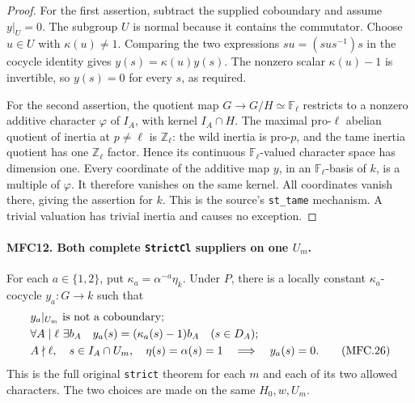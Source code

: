 \documentclass[11pt,a4paper]{article}
\numberwithin{equation}{section}
\theoremstyle{remark}\newtheorem{remark}[theorem]{Remark}
\begin{document}
\begin{proof}
For the first assertion, subtract the supplied coboundary and
assume \(y|_U=0\).  The subgroup \(U\) is normal because it
contains the commutator.  Choose \(u\in U\) with
\(\kappa(u)\ne1\).  Comparing the two expressions
\(su=(sus^{-1})s\) in the cocycle identity gives
\(y(s)=\kappa(u)y(s)\).  The nonzero scalar
\(\kappa(u)-1\) is invertible, so \(y(s)=0\) for every
\(s\), as required.

For the second assertion, the quotient map
\(G\to G/H\simeq\mathbb F_\ell\) restricts to a nonzero
additive character \(\varphi\) of \(I_A\), with kernel
\(I_A\cap H\).  The maximal pro-\(\ell\) abelian quotient
of inertia at \(p\ne\ell\) is \(\mathbb Z_\ell\): the
wild inertia is pro-\(p\), and the tame inertia quotient has
one \(\mathbb Z_\ell\) factor.  Hence its continuous
\(\mathbb F_\ell\)-valued character space has dimension one.
Every coordinate of the additive map \(y\), in an
\(\mathbb F_\ell\)-basis of \(k\), is a multiple of
\(\varphi\).  It therefore vanishes on the same kernel.
All coordinates vanish there, giving the assertion for \(k\).
This is the source's \texttt{st\_\allowbreak tame} mechanism.  A trivial
valuation has trivial inertia and causes no exception.
\end{proof}

\paragraph{MFC12. Both complete \texttt{Strict\allowbreak Cl} suppliers on one \(U_m\).}
\label{claim:MFC12}
For each \(a\in\{1,2\}\), put
\(\kappa_a=\alpha^{-a}\eta_k\).  Under \(P\), there is
a locally constant \(\kappa_a\)-cocycle \(y_a:G\to k\)
such that
\begin{align}
 &y_a|_{U_m}\text{ is not a coboundary};\notag\\
 &\forall A\mid\ell\ \exists b_A\quad
       y_a(s)=(\kappa_a(s)-1)b_A\quad(s\in D_A);\notag\\
 &A\nmid\ell,\quad s\in I_A\cap U_m,\quad
       \eta(s)=\alpha(s)=1\quad\Longrightarrow\quad y_a(s)=0.
                                                               \tag{MFC.26}
\end{align}
This is the full original \texttt{strict} theorem for each
\(m\) and each of its two allowed characters.  The two choices
are made on the same \(H_0,w,U_m\).
\end{document}
